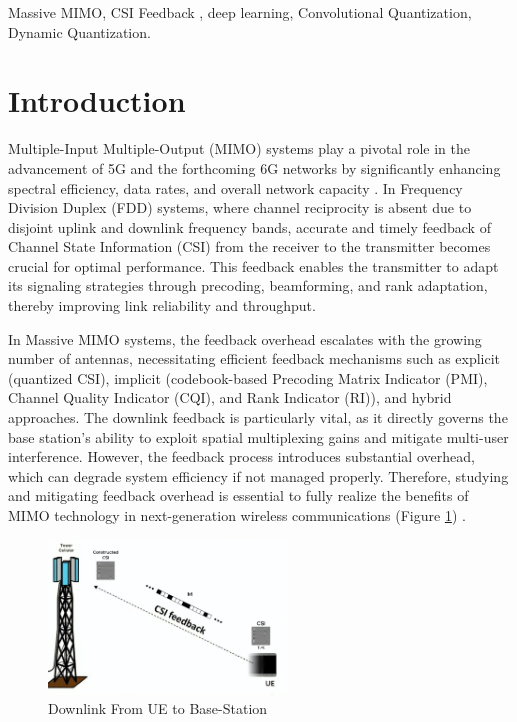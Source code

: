\documentclass[lettersize,journal]{IEEEtran}
\begin{document}
\begin{IEEEkeywords}
Massive MIMO, CSI Feedback , deep learning, Convolutional Quantization,
Dynamic Quantization.
\end{IEEEkeywords}


\section{Introduction}
\label{sec:introduction}
Multiple-Input Multiple-Output (MIMO) systems play a pivotal role in the advancement of 5G and the forthcoming 6G networks by significantly enhancing spectral efficiency, data rates, and overall network capacity \cite{abc}. In Frequency Division Duplex (FDD) systems, where channel reciprocity is absent due to disjoint uplink and downlink frequency bands, accurate and timely feedback of Channel State Information (CSI) from the receiver to the transmitter becomes crucial for optimal performance. This feedback enables the transmitter to adapt its signaling strategies through precoding, beamforming, and rank adaptation, thereby improving link reliability and throughput. 

In Massive MIMO systems, the feedback overhead escalates with the growing number of antennas, necessitating efficient feedback mechanisms such as explicit (quantized CSI), implicit (codebook-based Precoding Matrix Indicator (PMI), Channel Quality Indicator (CQI), and Rank Indicator (RI)), and hybrid approaches. The downlink feedback is particularly vital, as it directly governs the base station's ability to exploit spatial multiplexing gains and mitigate multi-user interference. However, the feedback process introduces substantial overhead, which can degrade system efficiency if not managed properly. Therefore, studying and mitigating feedback overhead is essential to fully realize the benefits of MIMO technology in next-generation wireless communications (Figure \ref{csifeedbackimage}) \cite{abd}.

\begin{figure}[!t]
	\centering
	\includegraphics[width=2.5in]{BTS_User_Equipement.pdf}
	\caption{Downlink From UE to Base-Station}
	\label{csifeedbackimage}
\end{figure}
\end{document}
